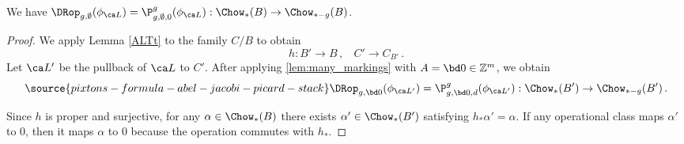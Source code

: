 \begin{lemma}
\notready \label{Lem:DR_alteration_invar}
We have %
$\DRop_{g,\emptyset}(\phi_{\ca L})=
\P_{g,\emptyset,0}^g(\phi_{\ca L}) :\Chow_*(B) \to \Chow_{*-g}(B)$.
\end{lemma}
\begin{proof}
We apply Lemma \ref{ALTt} to the family $C/B$ to obtain
$$h\colon B' \to B\, , \ \ \ \ C' \to C_{B'}\, .$$
Let $\ca L'$ be the pullback of $\ca L$ to $C'$.
After applying \cref{lem:many_markings} with $A = \bd 0 \in \mathbb{Z}^m$, we obtain
\begin{equation}\label{eq:an_equality}
\source{pixtons-formula-abel-jacobi-picard-stack}
\DRop_{g,\bd 0}(\phi_{\ca L'})=\P_{g,\bd 0,d}^g(\phi_{\ca L'}):
\Chow_*(B') \to \Chow_{*-g}(B')\, .
\end{equation}


Since $h$ is proper and surjective, for any $\alpha \in \Chow_*(B)$ there exists $\alpha'\in \Chow_*(B')$ satisfying $h_*\alpha'=\alpha$. If any operational class maps $\alpha'$ to $0$, then it maps $\alpha$ to $0$ because the operation
commutes with $h_*$.







\end{proof}
